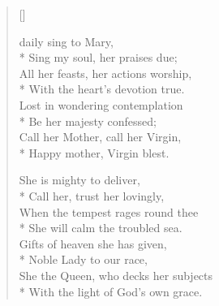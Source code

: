 \newHymn


\begin{verse}[\versewidth]

 daily sing to Mary,\\*
Sing my soul, her praises due;\\
All her feasts, her actions worship,\\*
With the heart's devotion true.\\
Lost in wondering contemplation\\*
Be her majesty confessed;\\
Call her Mother, call her Virgin,\\*
Happy mother, Virgin blest.

 She is mighty to deliver,\\*
Call her, trust her lovingly,\\
When the tempest rages round thee\\*
She will calm the troubled sea.\\
Gifts of heaven she has given,\\*
Noble Lady to our race,\\
She the Queen, who decks her subjects\\*
With the light of God's own grace.

\end{verse}

